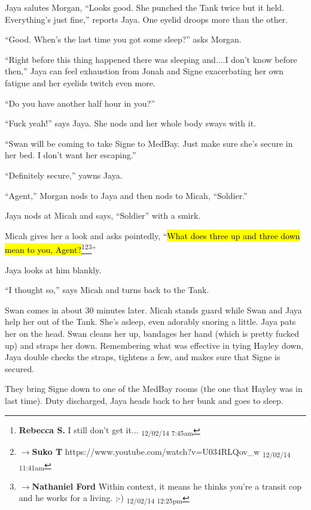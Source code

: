 Jaya salutes Morgan, ``Looks good.  She punched the Tank twice but it held.  Everything's just fine,''  reports Jaya.  One eyelid droops more than the other.

``Good.  When's the last time you got some sleep?'' asks Morgan.

``Right before this thing happened there was sleeping and....I don't know before then,'' Jaya can feel exhaustion from Jonah and Signe exacerbating her own fatigue and her eyelids twitch even more.

``Do you have another half hour in you?''

``Fuck yeah!'' says Jaya.  She nods and her whole body sways with it.

``Swan will be coming to take Signe to MedBay.  Just make sure she's secure in her bed.  I don't want her escaping.''

``Definitely secure,'' yawns Jaya.

``Agent,'' Morgan nods to Jaya and then nods to Micah, ``Soldier.''

Jaya nods at Micah and says, ``Soldier'' with a smirk.

Micah gives her a look and asks pointedly, ``\hl{What does three up and three down mean to you, Agent?}\footnote{\textbf{Rebecca S. }I still don't get it... \textsubscript{12/02/14 7:45am}}\footnote{$\rightarrow$\textbf{Suko T }https://www.youtube.com/watch?v=U034RLQov\_w \textsubscript{12/02/14 11:41am}}\footnote{$\rightarrow$\textbf{Nathaniel Ford }Within context, it means he thinks you're a transit cop and he works for a living. ;-) \textsubscript{12/02/14 12:25pm}}''

Jaya looks at him blankly.

``I thought so,'' says Micah and turns back to the Tank.

Swan comes in about 30 minutes later.  Micah stands guard while Swan and Jaya help her out of the Tank.  She's asleep, even adorably snoring a little.  Jaya pats her on the head.  Swan cleans her up, bandages her hand (which is pretty fucked up) and straps her down.  Remembering what was effective in tying Hayley down, Jaya double checks the straps, tightens a few, and makes sure that Signe is secured.



They bring Signe down to one of the MedBay rooms (the one that Hayley was in last time).  Duty discharged, Jaya heads back to her bunk and goes to sleep.





